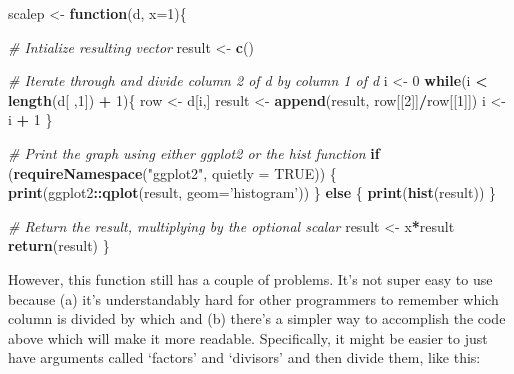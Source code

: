 \documentclass[]{book}
\newenvironment{Shaded}{\begin{snugshade}}{\end{snugshade}}
\newcommand{\KeywordTok}[1]{\textcolor[rgb]{0.13,0.29,0.53}{\textbf{#1}}}
\newcommand{\DataTypeTok}[1]{\textcolor[rgb]{0.13,0.29,0.53}{#1}}
\newcommand{\DecValTok}[1]{\textcolor[rgb]{0.00,0.00,0.81}{#1}}
\newcommand{\StringTok}[1]{\textcolor[rgb]{0.31,0.60,0.02}{#1}}
\newcommand{\CommentTok}[1]{\textcolor[rgb]{0.56,0.35,0.01}{\textit{#1}}}
\newcommand{\OtherTok}[1]{\textcolor[rgb]{0.56,0.35,0.01}{#1}}
\newcommand{\ControlFlowTok}[1]{\textcolor[rgb]{0.13,0.29,0.53}{\textbf{#1}}}
\newcommand{\OperatorTok}[1]{\textcolor[rgb]{0.81,0.36,0.00}{\textbf{#1}}}
\newcommand{\NormalTok}[1]{#1}
\begin{document}
\begin{Shaded}
\begin{Highlighting}[]
\NormalTok{scalep <-}\StringTok{ }\ControlFlowTok{function}\NormalTok{(d, }\DataTypeTok{x=}\DecValTok{1}\NormalTok{)\{}

  \CommentTok{# Intialize resulting vector}
\NormalTok{  result <-}\StringTok{ }\KeywordTok{c}\NormalTok{()}

  \CommentTok{# Iterate through and divide column 2 of d by column 1 of d}
\NormalTok{  i <-}\StringTok{ }\DecValTok{0}
  \ControlFlowTok{while}\NormalTok{(i }\OperatorTok{<}\StringTok{ }\KeywordTok{length}\NormalTok{(d[ ,}\DecValTok{1}\NormalTok{]) }\OperatorTok{+}\StringTok{ }\DecValTok{1}\NormalTok{)\{}
\NormalTok{    row <-}\StringTok{ }\NormalTok{d[i,]}
\NormalTok{    result <-}\StringTok{ }\KeywordTok{append}\NormalTok{(result, row[[}\DecValTok{2}\NormalTok{]]}\OperatorTok{/}\NormalTok{row[[}\DecValTok{1}\NormalTok{]])}
\NormalTok{    i <-}\StringTok{ }\NormalTok{i }\OperatorTok{+}\StringTok{ }\DecValTok{1}
\NormalTok{  \}}

  \CommentTok{# Print the graph using either ggplot2 or the hist function}
  \ControlFlowTok{if}\NormalTok{ (}\KeywordTok{requireNamespace}\NormalTok{(}\StringTok{"ggplot2"}\NormalTok{, }\DataTypeTok{quietly =} \OtherTok{TRUE}\NormalTok{)) \{}
    \KeywordTok{print}\NormalTok{(ggplot2}\OperatorTok{::}\KeywordTok{qplot}\NormalTok{(result, }\DataTypeTok{geom=}\StringTok{'histogram'}\NormalTok{))}
\NormalTok{  \} }\ControlFlowTok{else}\NormalTok{ \{}
    \KeywordTok{print}\NormalTok{(}\KeywordTok{hist}\NormalTok{(result))}
\NormalTok{  \}}

  \CommentTok{# Return the result, multiplying by the optional scalar}
\NormalTok{  result <-}\StringTok{ }\NormalTok{x}\OperatorTok{*}\NormalTok{result}
  \KeywordTok{return}\NormalTok{(result)}
\NormalTok{\}}
\end{Highlighting}
\end{Shaded}

However, this function still has a couple of problems. It's not super
easy to use because (a) it's understandably hard for other programmers
to remember which column is divided by which and (b) there's a simpler
way to accomplish the code above which will make it more readable.
Specifically, it might be easier to just have arguments called `factors'
and `divisors' and then divide them, like this:
\end{document}
